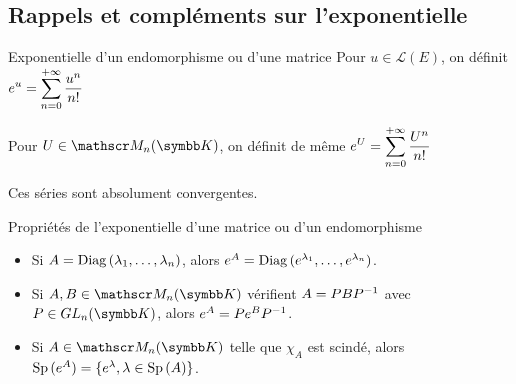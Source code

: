 \subsection{Rappels et compléments sur l'exponentielle}

\begin{definition}{Exponentielle d'un endomorphisme ou d'une matrice}{}
    Pour $u \in \mathscr L(E)$, on définit $\displaystyle e^u = \sum_{n = 0}^{+ \infty} \frac{u^n}{n!}$

    Pour $U \in \mathscr M_n(\K)$, on définit de même $\displaystyle e^U = \sum_{n = 0}^{+ \infty} \frac{U^n}{n!}$
    
    Ces séries sont absolument convergentes. 
\end{definition}

\begin{propositionnt}{Propriétés de l'exponentielle d'une matrice ou d'un endomorphisme}{}
    \begin{itemize}
        \item  Si $A = \operatorname{Diag} \, (\lambda_1, \dots, \lambda_n)$, alors $e^A = \operatorname{Diag} \, (e^{\lambda_1}, \dots, e^{\lambda_n})$.
        \item Si $A, B \in \mathscr M_n(\K)$ vérifient $A = PBP^{-1}$ avec $P \in GL_n(\K)$, alors $e^A = P e^B P^{-1}$.
        \item Si $A \in \mathscr M_n(\K)$ telle que $\chi_A$ est scindé, alors 
        $\operatorname{Sp} \,(e^A) = \{e^\lambda, \lambda \in \operatorname{Sp} \,(A)\}$. 
    \end{itemize}
\end{propositionnt}

